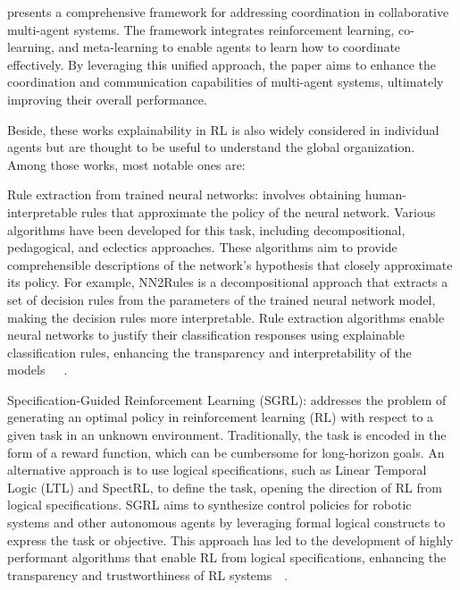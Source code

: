 \documentclass[runningheads]{llncs}
\begin{document}
\cite{Tosic2010} presents a comprehensive framework for addressing coordination in collaborative multi-agent systems. The framework integrates reinforcement learning, co-learning, and meta-learning to enable agents to learn how to coordinate effectively. By leveraging this unified approach, the paper aims to enhance the coordination and communication capabilities of multi-agent systems, ultimately improving their overall performance. 

Beside, these works explainability in RL is also widely considered in individual agents but are thought to be useful to understand the global organization. Among those works, most notable ones are:

Rule extraction from trained neural networks: involves obtaining human-interpretable rules that approximate the policy of the neural network. Various algorithms have been developed for this task, including decompositional, pedagogical, and eclectics approaches. These algorithms aim to provide comprehensible descriptions of the network's hypothesis that closely approximate its policy. For example, NN2Rules is a decompositional approach that extracts a set of decision rules from the parameters of the trained neural network model, making the decision rules more interpretable. Rule extraction algorithms enable neural networks to justify their classification responses using explainable classification rules, enhancing the transparency and interpretability of the models~\cite{Hailesilassie2016}~\cite{Sato2001}~\cite{Lal2022}.

Specification-Guided Reinforcement Learning (SGRL): addresses the problem of generating an optimal policy in reinforcement learning (RL) with respect to a given task in an unknown environment. Traditionally, the task is encoded in the form of a reward function, which can be cumbersome for long-horizon goals. An alternative approach is to use logical specifications, such as Linear Temporal Logic (LTL) and SpectRL, to define the task, opening the direction of RL from logical specifications. SGRL aims to synthesize control policies for robotic systems and other autonomous agents by leveraging formal logical constructs to express the task or objective. This approach has led to the development of highly performant algorithms that enable RL from logical specifications, enhancing the transparency and trustworthiness of RL systems~\cite{Bansal2022}~\cite{Jothimurugan2023}.
\end{document}
